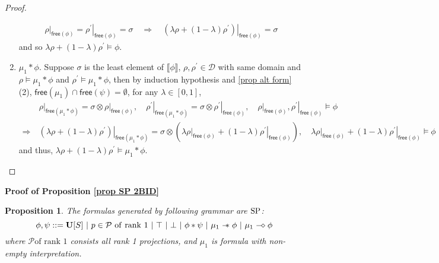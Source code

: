\documentclass[conference,compsoc, 10pt]{IEEEtran}
\newtheorem{proposition}{Proposition}[section]
\newcommand {\cD } {{\mathcal{D}}}
\newcommand {\cP } {{\mathcal{P}}}
\newcommand {\free }[1] {{\mathsf{free}\left(#1\right)}}
\newcommand {\rt }[2] {{\left.{#1}\right|_{#2}}}
\newcommand {\unia } {{\mathbf{U}}}
\newcommand {\sepimp} {\mathrel{-\mkern-6mu*}}
\newcommand {\sem}[1] {\llbracket#1\rrbracket}
\newcommand {\sdimp} {\mathrel{-\mkern-2.5mu\diamond}}
\begin{document}
\begin{appendices}
\begin{proof}
\begin{enumerate}
				\begin{align*}
				\rt{\rho}{\free{\phi}} = \rt{\rho^\prime}{\free{\phi}} = \sigma\quad\Rightarrow\quad \rt{\left(\lambda\rho + (1-\lambda)\rho^\prime\right)}{\free{\phi}} = \sigma
				\end{align*}
				and so $\lambda\rho + (1-\lambda)\rho^\prime\models\phi$.
				\item $\mu_1\ast\phi$. Suppose $\sigma$ is the least element of $\sem{\phi}$, $\rho,\rho^\prime\in\cD$ with same domain and $\rho\models \mu_1\ast\phi$ and $\rho^\prime\models \mu_1\ast\phi$, then by induction hypothesis and \ref{prop alt form} (2), $\free{\mu_1}\cap\free{\psi} = \emptyset$, for any $\lambda\in[0,1]$, 
				\begin{align*}
				&\rt{\rho}{\free{\mu_1\ast\phi}} = \sigma \otimes \rt{\rho}{\free{\phi}},\quad \rt{\rho^\prime}{\free{\mu_1\ast\phi}} = \sigma \otimes \rt{\rho^\prime}{\free{\phi}},\quad \rt{\rho}{\free{\phi}},\rt{\rho^\prime}{\free{\phi}}\models\phi \\
				\Rightarrow\ &\rt{\left(\lambda\rho + (1-\lambda)\rho^\prime\right)}{\free{\mu_1\ast\phi}} = \sigma \otimes \left(\lambda\rt{\rho}{\free{\phi}} + (1-\lambda)\rt{\rho^\prime}{\free{\phi}} \right),\quad \lambda\rt{\rho}{\free{\phi}} + (1-\lambda)\rt{\rho^\prime}{\free{\phi}} \models\phi
				\end{align*}
				and thus, $\lambda\rho + (1-\lambda)\rho^\prime\models\mu_1\ast\phi$.
			\end{enumerate}
		\end{proof}
		
		\vspace{0.5cm}
		
		\noindent\textbf{Proof of Proposition \ref{prop SP 2BID}}
		
		\begin{proposition}
			The formulas generated by following grammar are ${\rm SP}$: 
			$$
			\phi,\psi ::= \unia[S]\ |\ p\in\cP {\rm\ of\ rank\ 1}\ |\ \top\ |\ \bot\ |\ \phi\ast\psi\ |\ \mu_1 \sepimp \phi\ |\ \mu_1 \sdimp \phi
			$$
			where $\cP \text{of rank 1}$ consists all rank 1 projections, and $\mu_1$ is formula with non-empty interpretation.
		\end{proposition}
		

\end{appendices}
\end{document}
